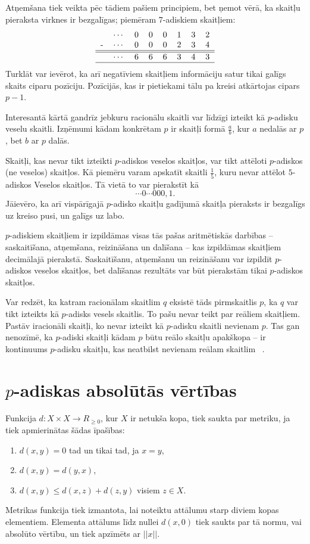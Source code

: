 \documentclass{ludis}
\begin{document}
Atņemšana tiek veikta pēc tādiem pašiem principiem, bet ņemot vērā, ka skaitļu pieraksta virknes ir bezgalīgas; piemēram $7$-adiskiem skaitļiem:
\[
\begin{tabular}{rrrrrrrrr|}
&$\cdots$ &0 &0 &0 &1 &3 &2\\
-&$\cdots$ &0 &0 &0 &2 &3 &4\\
\hline
\hline
&$\cdots$ &6 &6 &6 &3 &4 &3\\
\hline
\end{tabular}
\]
Turklāt var ievērot, ka arī negatīviem skaitļiem informāciju satur tikai galīgs skaits ciparu pozīciju. Pozīcijās, kas ir pietiekami tālu pa kreisi atkārtojas cipars $p-1$.

Interesantā kārtā gandrīz jebkuru racionālu skaitli var līdzīgi izteikt kā $p$-adisku veselu skaitli.
Izņēmumi kādam konkrētam $p$ ir skaitļi formā $\frac{a}{b}$, kur $a$ nedalās ar $p$, bet $b$ ar $p$ dalās.

Skaitļi, kas nevar tikt izteikti $p$-adiskos veselos skaitļos, var tikt attēloti $p$-adiskos (ne veselos) skaitļos. Kā piemēru varam apskatīt skaitli $\frac{1}{5}$, kuru nevar attēlot $5$-adiskos Veselos skaitļos. Tā vietā to var pierakstīt kā
\[
\cdots 0 \cdots 000,1.
\]
Jāievēro, ka arī vispārīgajā $p$-adisko skaitļu gadījumā skaitļa pieraksts ir bezgalīgs uz kreiso pusi, un galīgs uz labo.

$p$-adiskiem skaitļiem ir izpildāmas visas tās pašas aritmētiskās darbības -- saskaitīšana, atņemšana, reizināšana un dalīšana -- kas izpildāmas skaitļiem decimālajā pierakstā. Saskaitīšanu, atņemšanu un reizināšanu var izpildīt $p$-adiskos veselos skaitļos, bet dalīšanas rezultāts var būt pierakstām tikai $p$-adiskos skaitļos.

Var redzēt, ka katram racionālam skaitlim $q$ eksistē tāds pirmskaitlis $p$, ka $q$ var tikt izteikts kā $p$-adisks vesels skaitlis. To pašu nevar teikt par reāliem skaitļiem. Pastāv iracionāli skaitļi, ko nevar izteikt kā $p$-adisku skaitli nevienam $p$. Tas gan nenozīmē, ka $p$-adiski skaitļi kādam $p$ būtu reālo skaitļu apakškopa -- ir kontinuums $p$-adisku skaitļu, kas neatbilst nevienam reālam skaitlim ~\citep{Freivalds2012}.

\section{$p$-adiskas absolūtās vērtības}
Funkcija $d: X \times X \rightarrow R_{\geq 0}$, kur $X$ ir netukša kopa, tiek saukta par metriku, ja tiek apmierinātas šādas īpašības:
\begin{enumerate}
\item $d(x,y) = 0$ tad un tikai tad, ja $x = y$,
\item $d(x,y) = d(y,x)$,
\item $d(x,y) \leq d(x,z) + d(z,y)$ visiem $z \in X$.
\end{enumerate}
Metrikas funkcija tiek izmantota, lai noteiktu attālumu starp diviem kopas elementiem. Elementa attālums līdz nullei $d(x,0)$ tiek saukts  par tā normu, vai absolūto vērtību, un tiek apzīmēts ar $||x||$.
\end{document}
